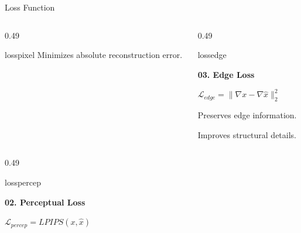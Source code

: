 \documentclass[
    11pt,%
    aspectratio=169,%
]{beamer}
\begin{document}
\begin{frame}{Loss Function}
\begin{columns}[T,onlytextwidth]
\begin{column}{0.49\textwidth}
\begin{beamercolorbox}[
    wd=\linewidth,
    sep=0.10cm,
    rounded=true
]{losspixel}
    Minimizes absolute reconstruction error.

\end{beamercolorbox}

\end{column}


\begin{column}{0.49\textwidth}

\begin{beamercolorbox}[
    wd=\linewidth,
    sep=0.10cm,
    rounded=true
]{lossedge}

    {\color{LossNavy}\bfseries 03. Edge Loss}

    \vspace{0.10cm}

    \centering
    $\displaystyle
    \mathcal{L}_{edge}
    =
    \|\nabla x-\nabla\hat{x}\|_2^2
    $

    \vspace{0.08cm}

    \raggedright

    Preserves edge information.

    Improves structural details.

\end{beamercolorbox}

\end{column}

\end{columns}

\vspace{0.10cm}


\begin{columns}[T,onlytextwidth]


\begin{column}{0.49\textwidth}

\begin{beamercolorbox}[
    wd=\linewidth,
    sep=0.10cm,
    rounded=true
]{losspercep}

    {\color{LossNavy}\bfseries 02. Perceptual Loss}

    \vspace{0.10cm}

    \centering
    $\displaystyle
    \mathcal{L}_{percep}
    =
    LPIPS(x,\hat{x})
    $


\end{beamercolorbox}
\end{column}
\end{columns}
\end{frame}
\end{document}
